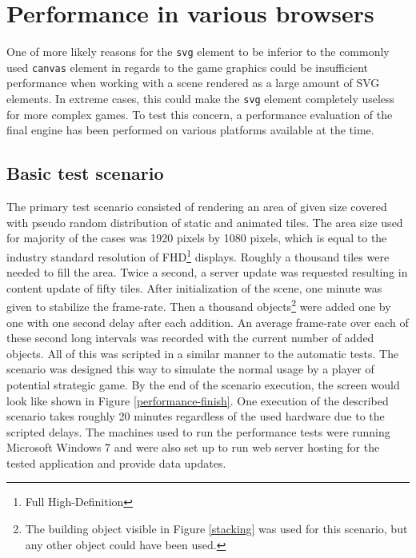 \documentclass[11pt,oneside, final]{fithesis2}
\begin{document}
\section{Performance in various browsers}
One of more likely reasons for the \texttt{svg} element to be inferior to the commonly used \texttt{canvas} element in regards to the game graphics could be insufficient performance when working with a scene rendered as a large amount of SVG elements. In extreme cases, this could make the \texttt{svg} element completely useless for more complex games. To test this concern, a performance evaluation of the final engine has been performed on various platforms available at the time.

\subsection{Basic test scenario}
The primary test scenario consisted of rendering an area of given size covered with pseudo random distribution of static and animated tiles. The area size used for majority of the cases was 1920 pixels by 1080 pixels, which is equal to the industry standard resolution of FHD\footnote{Full High-Definition} displays. Roughly a thousand tiles were needed to fill the area. Twice a second, a server update was requested resulting in content update of fifty tiles. After initialization of the scene, one minute was given to stabilize the frame-rate. Then a thousand objects\footnote{The building object visible in Figure \ref{stacking} was used for this scenario, but any other object could have been used.} were added one by one with one second delay after each addition. An average frame-rate over each of these second long intervals was recorded with the current number of added objects. All of this was scripted in a similar manner to the automatic tests. The scenario was designed this way to simulate the normal usage by a player of potential strategic game. By the end of the scenario execution, the screen would look like shown in Figure \ref{performance-finish}. One execution of the described scenario takes roughly 20 minutes regardless of the used hardware due to the scripted delays. The machines used to run the performance tests were running Microsoft Windows 7 and were also set up to run web server hosting for the tested application and provide data updates.
\end{document}

